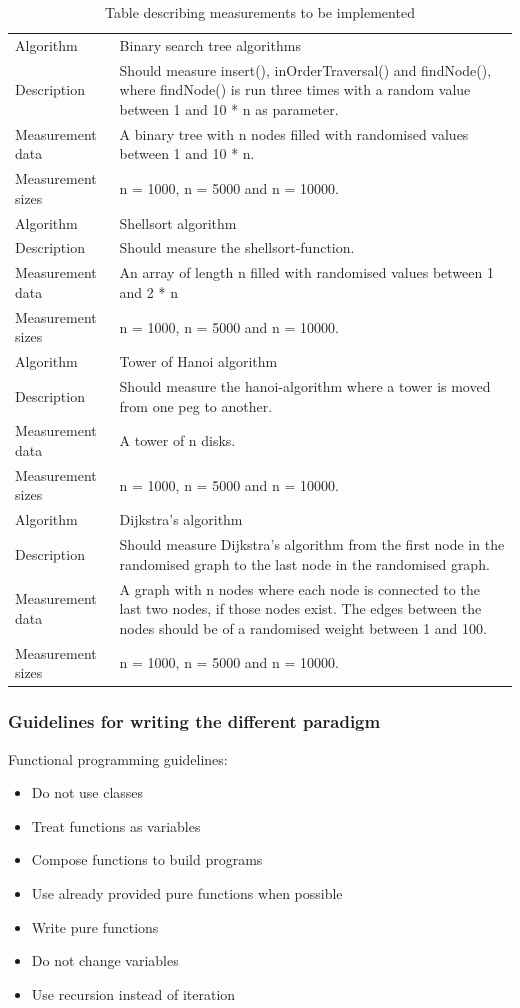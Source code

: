 \documentclass {article}
\begin{document}
\begin{table}[H]
\begin{tabular}{ | l p{10cm} | }
\hline
Algorithm & Binary search tree algorithms \\
Description & Should measure insert(), inOrderTraversal() and findNode(), where findNode() is run three times with a random value between 1 and 10 * n as parameter. \\
Measurement data & A binary tree with n nodes filled with randomised values between 1 and 10 * n. \\ 
Measurement sizes & n = 1000, n = 5000 and n = 10000. \\
\hline
Algorithm & Shellsort algorithm \\
Description & Should measure the shellsort-function.\\
Measurement data & An array of length n filled with randomised values between 1 and 2 * n \\ 
Measurement sizes & n = 1000, n = 5000 and n = 10000. \\
\hline
Algorithm & Tower of Hanoi algorithm \\
Description & Should measure the hanoi-algorithm where a tower is moved from one peg to another. \\
Measurement data & A tower of n disks. \\ 
Measurement sizes & n = 1000, n = 5000 and n = 10000. \\
\hline
Algorithm & Dijkstra's algorithm \\
Description & Should measure Dijkstra's algorithm from the first node in the randomised graph to the last node in the randomised graph.\\
Measurement data & A graph with n nodes where each node is connected to the last two nodes, if those nodes exist. The edges between the nodes should be of a randomised weight between 1 and 100.\\ 
Measurement sizes & n = 1000, n = 5000 and n = 10000. \\
\hline
\end{tabular}
\caption{Table describing measurements to be implemented}
\label{tab:measurements}
\end{table}
\subsubsection{Guidelines for writing the different paradigm}
\label{sec:paradigm-guidelines}
Functional programming guidelines:
\begin{itemize}
\item Do not use classes
\item Treat functions as variables
\item Compose functions to build programs
\item Use already provided pure functions when possible
\item Write pure functions
\item Do not change variables
\item Use recursion instead of iteration
\end{itemize}
\end{document}
